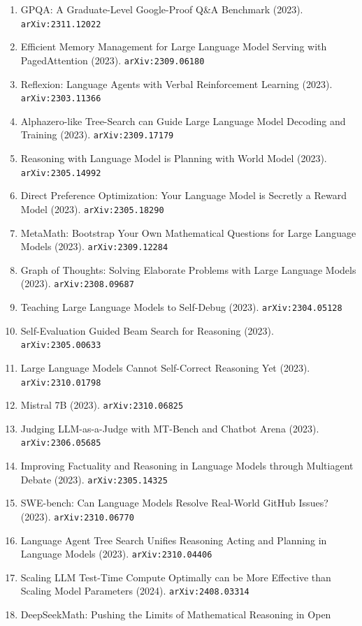 \documentclass[11pt]{article}
\begin{document}
\begin{enumerate}
  Annotations (2023). \texttt{arXiv:2312.08935}
  \item GPQA: A Graduate-Level Google-Proof Q\&A Benchmark (2023). \texttt{arXiv:2311.12022}
  \item Efficient Memory Management for Large Language Model Serving with
  PagedAttention (2023). \texttt{arXiv:2309.06180}
  \item Reflexion: Language Agents with Verbal Reinforcement Learning (2023). \texttt{arXiv:2303.11366}
  \item Alphazero-like Tree-Search can Guide Large Language Model Decoding and
  Training (2023). \texttt{arXiv:2309.17179}
  \item Reasoning with Language Model is Planning with World Model (2023). \texttt{arXiv:2305.14992}
  \item Direct Preference Optimization: Your Language Model is Secretly a Reward
  Model (2023). \texttt{arXiv:2305.18290}
  \item MetaMath: Bootstrap Your Own Mathematical Questions for Large Language
  Models (2023). \texttt{arXiv:2309.12284}
  \item Graph of Thoughts: Solving Elaborate Problems with Large Language Models (2023). \texttt{arXiv:2308.09687}
  \item Teaching Large Language Models to Self-Debug (2023). \texttt{arXiv:2304.05128}
  \item Self-Evaluation Guided Beam Search for Reasoning (2023). \texttt{arXiv:2305.00633}
  \item Large Language Models Cannot Self-Correct Reasoning Yet (2023). \texttt{arXiv:2310.01798}
  \item Mistral 7B (2023). \texttt{arXiv:2310.06825}
  \item Judging LLM-as-a-Judge with MT-Bench and Chatbot Arena (2023). \texttt{arXiv:2306.05685}
  \item Improving Factuality and Reasoning in Language Models through Multiagent
  Debate (2023). \texttt{arXiv:2305.14325}
  \item SWE-bench: Can Language Models Resolve Real-World GitHub Issues? (2023). \texttt{arXiv:2310.06770}
  \item Language Agent Tree Search Unifies Reasoning Acting and Planning in
  Language Models (2023). \texttt{arXiv:2310.04406}
  \item Scaling LLM Test-Time Compute Optimally can be More Effective than
  Scaling Model Parameters (2024). \texttt{arXiv:2408.03314}
  \item DeepSeekMath: Pushing the Limits of Mathematical Reasoning in Open

\end{enumerate}
\end{document}
